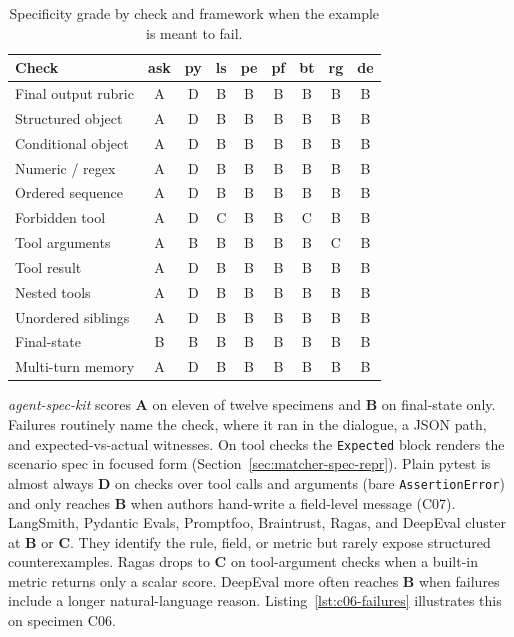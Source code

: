 \begin{table}[htbp]
\centering
\caption{Specificity grade by check and framework when the example is meant to fail.}
\label{tab:failure-specificity}
\footnotesize
\begin{tabular}{@{}p{2.8cm}cccccccc@{}}
\toprule
Check & ask & py & ls & pe & pf & bt & rg & de \\
\midrule
Final output rubric & A & D & B & B & B & B & B & B \\
Structured object & A & D & B & B & B & B & B & B \\
Conditional object & A & D & B & B & B & B & B & B \\
Numeric / regex & A & D & B & B & B & B & B & B \\
Ordered sequence & A & D & B & B & B & B & B & B \\
Forbidden tool & A & D & C & B & B & C & B & B \\
Tool arguments & A & B & B & B & B & B & C & B \\
Tool result & A & D & B & B & B & B & B & B \\
Nested tools & A & D & B & B & B & B & B & B \\
Unordered siblings & A & D & B & B & B & B & B & B \\
Final-state & B & B & B & B & B & B & B & B \\
Multi-turn memory & A & D & B & B & B & B & B & B \\
\bottomrule
\end{tabular}
\end{table}

\emph{agent-spec-kit} scores \textbf{A} on eleven of twelve specimens and \textbf{B} on final-state only. Failures routinely name the check, where it ran in the dialogue, a JSON path, and expected-vs-actual witnesses. On tool checks the \texttt{Expected} block renders the scenario spec in focused form (Section~\ref{sec:matcher-spec-repr}). Plain pytest is almost always \textbf{D} on checks over tool calls and arguments (bare \texttt{AssertionError}) and only reaches \textbf{B} when authors hand-write a field-level message (C07). LangSmith, Pydantic Evals, Promptfoo, Braintrust, Ragas, and DeepEval cluster at \textbf{B} or \textbf{C}. They identify the rule, field, or metric but rarely expose structured counterexamples. Ragas drops to \textbf{C} on tool-argument checks when a built-in metric returns only a scalar score. DeepEval more often reaches \textbf{B} when failures include a longer natural-language reason. Listing~\ref{lst:c06-failures} illustrates this on specimen C06.

